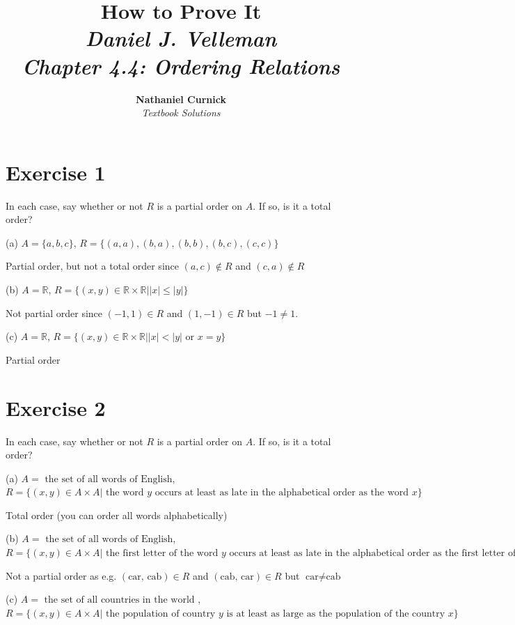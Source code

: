 \documentclass[11pt]{article}
\title{\textbf{How to Prove It} \\ {\Large\itshape Daniel J. Velleman} \\ {\Large\itshape Chapter 4.4: Ordering Relations}}
\author{\textbf{Nathaniel Curnick} \\ \textit{Textbook Solutions}}
\date{}
\begin{document}
\maketitle

\section*{Exercise 1}

In each case, say whether or not $R$ is a partial order on $A$. If so, is it a 
total order?

\noindent (a) $A = \{a, b, c\}$, $R = \{(a,a),(b,a),(b,b),(b,c),(c,c)\}$

Partial order, but not a total order since $(a,c) \notin R$ and $(c, a) \notin R$

\noindent (b) $A = \mathbb{R}$, $R = \{(x, y) \in \mathbb{R} \times \mathbb{R} | |x| \leq |y|\}$

Not partial order since $(-1, 1) \in R$ and $(1, -1) \in R$ but $-1 \neq 1$.

\noindent (c) $A = \mathbb{R}$, $R = \{(x, y) \in \mathbb{R} \times \mathbb{R} | |x| < |y| \text{ or } x = y\}$

Partial order

\section*{Exercise 2}

In each case, say whether or not $R$ is a partial order on $A$. If so, is it a 
total order?

\noindent (a) $A = \text{ the set of all words of English}$,
$R = \{(x, y) \in A \times A | \text{ the word } y \text{ occurs at least as late in the alphabetical order as the word } x\}$

Total order (you can order all words alphabetically)

\noindent (b) $A = \text{ the set of all words of English}$,
$R = \{(x, y) \in A \times A | \text{ the first letter of the word } y \text{ occurs at least as late in the alphabetical order as the first letter of the word } x\}$

Not a partial order as e.g. $(\text{car, cab}) \in R$ and $(\text{cab, car}) \in R$
but $\text{car} \neq \text{cab}$

\noindent (c) $A = \text{ the set of all countries in the world }$, 
$R = \{(x, y) \in A \times A | \text{ the population of country } y \text{ is at least as large as the population of the country } x\}$
\end{document}
